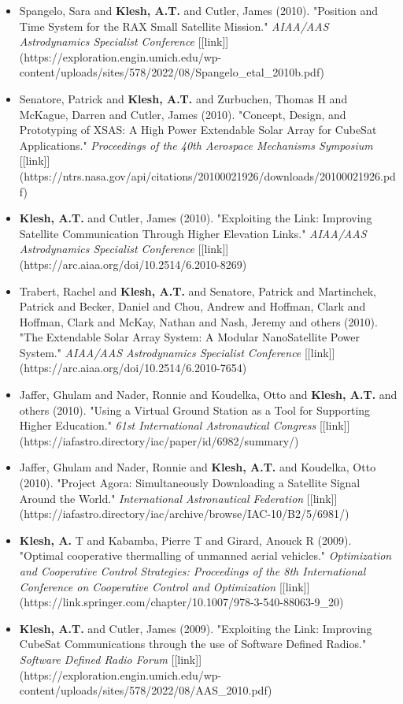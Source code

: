 \documentclass[11pt,letterpaper]{article}
\begin{document}
\begin{itemize}
\item Spangelo, Sara and \textbf{Klesh, A.T.} and Cutler, James (2010). "Position and Time System for the RAX Small Satellite Mission." \textit{AIAA/AAS Astrodynamics Specialist Conference} [[link]](https://exploration.engin.umich.edu/wp-content/uploads/sites/578/2022/08/Spangelo\_etal\_2010b.pdf)
\item Senatore, Patrick and \textbf{Klesh, A.T.} and Zurbuchen, Thomas H and McKague, Darren and Cutler, James (2010). "Concept, Design, and Prototyping of XSAS: A High Power Extendable Solar Array for CubeSat Applications." \textit{Proceedings of the 40th Aerospace Mechanisms Symposium} [[link]](https://ntrs.nasa.gov/api/citations/20100021926/downloads/20100021926.pdf)
\item \textbf{Klesh, A.T.} and Cutler, James (2010). "Exploiting the Link: Improving Satellite Communication Through Higher Elevation Links." \textit{AIAA/AAS Astrodynamics Specialist Conference} [[link]](https://arc.aiaa.org/doi/10.2514/6.2010-8269)
\item Trabert, Rachel and \textbf{Klesh, A.T.} and Senatore, Patrick and Martinchek, Patrick and Becker, Daniel and Chou, Andrew and Hoffman, Clark and Hoffman, Clark and McKay, Nathan and Nash, Jeremy and others (2010). "The Extendable Solar Array System: A Modular NanoSatellite Power System." \textit{AIAA/AAS Astrodynamics Specialist Conference} [[link]](https://arc.aiaa.org/doi/10.2514/6.2010-7654)
\item Jaffer, Ghulam and Nader, Ronnie and Koudelka, Otto and \textbf{Klesh, A.T.} and others (2010). "Using a Virtual Ground Station as a Tool for Supporting Higher Education." \textit{61st International Astronautical Congress} [[link]](https://iafastro.directory/iac/paper/id/6982/summary/)
\item Jaffer, Ghulam and Nader, Ronnie and \textbf{Klesh, A.T.} and Koudelka, Otto (2010). "Project Agora: Simultaneously Downloading a Satellite Signal Around the World." \textit{International Astronautical Federation} [[link]](https://iafastro.directory/iac/archive/browse/IAC-10/B2/5/6981/)
\item \textbf{Klesh, A.} T and Kabamba, Pierre T and Girard, Anouck R (2009). "Optimal cooperative thermalling of unmanned aerial vehicles." \textit{Optimization and Cooperative Control Strategies: Proceedings of the 8th International Conference on Cooperative Control and Optimization} [[link]](https://link.springer.com/chapter/10.1007/978-3-540-88063-9\_20)
\item \textbf{Klesh, A.T.} and Cutler, James (2009). "Exploiting the Link: Improving CubeSat Communications through the use of Software Defined Radios." \textit{Software Defined Radio Forum} [[link]](https://exploration.engin.umich.edu/wp-content/uploads/sites/578/2022/08/AAS\_2010.pdf)

\end{itemize}
\end{document}
